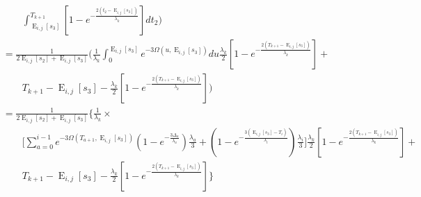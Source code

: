 \documentclass{article}
\DeclareMathOperator{\E}{E}
\begin{document}
\begin{align*}
    &\qquad
    \int_{\E_{i,j}[s_3]}^{T_{k+1}}\left[1-e^{-\frac{2\left(t_2-\E_{i,j}[s_3]\right)}{\lambda_k}}\right]dt_2
    \Bigg)\\
    &=\frac{1}{2\E_{i,j}[s_2]+\E_{i,j}[s_3]}\Bigg(\frac{1}{\lambda_k}\int_0^{\E_{i,j}[s_3]}e^{-3\Omega(u,\E_{i,j}[s_3])}du
    \frac{\lambda_k}{2}\left[1-e^{-\frac{2(T_{k+1}-\E_{i,j}[s_3])}{\lambda_k}}\right]+\\
    &\qquad
    T_{k+1}-\E_{i,j}[s_3]-\frac{\lambda_k}{2}\left[1-e^{-\frac{2(T_{k+1}-\E_{i,j}[s_3])}{\lambda_k}}\right]
    \Bigg)\\
    &=\frac{1}{2\E_{i,j}[s_2]+\E_{i,j}[s_3]}\Bigg\{\frac{1}{\lambda_k}\times\\
    &\qquad\Bigg[
    \sum_{a=0}^{i-1} e^{-3\Omega(T_{a+1},\E_{i,j}[s_3])}
    \left(1-e^{-\frac{3 \Delta_a}{\lambda_a}}\right)\frac{\lambda_a}{3}+
    \left(1-e^{-\frac{3 \left(\E_{i,j}[s_3]-T_{i}\right)}{\lambda_{i}}}\right)\frac{\lambda_{i}}{3}\Bigg]
    \frac{\lambda_k}{2}\left[1-e^{-\frac{2(T_{k+1}-\E_{i,j}[s_3])}{\lambda_k}}\right]+\\
   &\qquad
    T_{k+1}-\E_{i,j}[s_3]-\frac{\lambda_k}{2}\left[1-e^{-\frac{2(T_{k+1}-\E_{i,j}[s_3])}{\lambda_k}}\right]
    \Bigg\}\\
\end{align*}
\end{document}
